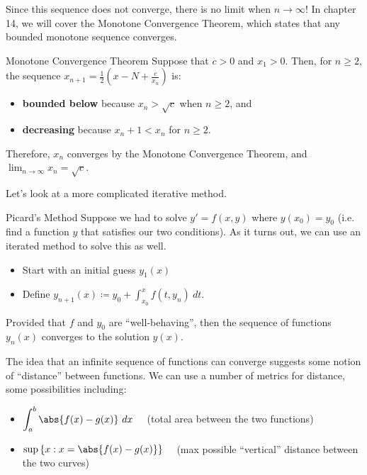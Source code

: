 
Since this sequence does not converge, there is no limit when $n \to \infty$! In chapter 14, we will cover the Monotone Convergence Theorem, which states that any bounded monotone sequence converges.

\begin{exbox}{Monotone Convergence Theorem}{}
    Suppose that $c > 0$ and $x_1 > 0$. Then, for $n \geq 2$, the sequence $x_{n+1} = \frac{1}{2} \left( x-N + \frac{c}{x_n} \right)$ is:
    \begin{itemize}
        \item \textbf{bounded below} because $x_n > \sqrt{c}$ when $n \geq 2$, and
        \item \textbf{decreasing} because $x_n+1 < x_n$ for $n \geq 2$.
    \end{itemize}
    Therefore, $x_n$ converges by the Monotone Convergence Theorem, and $\lim_{n\to\infty} x_n = \sqrt{c}$.
\end{exbox}

Let's look at a more complicated iterative method.

\begin{exbox}{Picard's Method}{}
    Suppose we had to solve $y\prime = f(x,y)$ where $y(x_0) = y_0$ (i.e. find a function $y$ that satisfies our two conditions). As it turns out, we can use an iterated method to solve this as well.
    \begin{itemize}
        \item Start with an initial guess $y_1(x)$
        \item Define $\displaystyle y_{n+1}(x) \coloneq y_0 + \int_{x_0}^{x} f(t, y_n)\ dt$.
    \end{itemize}
    Provided that $f$ and $y_0$ are ``well-behaving'', then the sequence of functions $y_n(x)$ converges to the solution $y(x)$.
\end{exbox}

The idea that an infinite sequence of functions can converge suggests some notion of ``distance'' between functions. We can use a number of metrics for distance, some possibilities including:
\begin{itemize}
    \item \( \displaystyle \int_a^b \abs{f(x) - g(x)}\ dx \quad \) (total area between the two functions)
    \item \( \displaystyle \sup \left\{ x : x = \abs{f(x) - g(x)} \right\} \quad \) (max possible ``vertical'' distance between the two curves)
\end{itemize}
